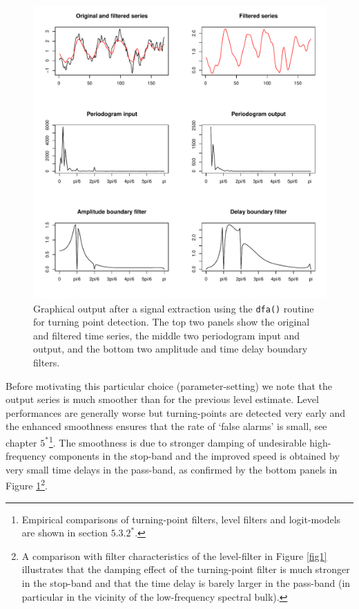 \documentclass[a4paper]{article}
\begin{document}
\begin{figure}[h!] 
\begin{center}
\includegraphics{tpfilter_la5_exp1k5_pbd1k02_pb_6k5_sb6_limamp5_nloops10_d0}
\caption{Graphical output after a signal extraction using the
  \texttt{dfa()} routine for turning point detection. The top two
  panels show the original and filtered time series, the middle two
  periodogram input and output, and the bottom two amplitude and time
  delay boundary filters.\label{fig2}}
\end{center}
\end{figure}

Before motivating this particular choice (parameter-setting) we note
that the output series is much smoother than for the previous level
estimate. Level performances are generally worse but turning-points
are detected very early and the enhanced smoothness ensures that the
rate of `false alarms' is small, see chapter $5^*$\footnote{Empirical
  comparisons of turning-point filters, level filters and logit-models
  are shown in section $5.3.2^*$.}. The smoothness is due to stronger
damping of undesirable high-frequency components in the stop-band and
the improved speed is obtained by very small time delays in the
pass-band, as confirmed by the bottom panels in
Figure \ref{fig2}\footnote{A comparison with filter characteristics of
  the level-filter in Figure \ref{fig1} illustrates that the damping
  effect of the turning-point filter is much stronger in the stop-band
  and that the time delay is barely larger in the pass-band (in
  particular in the vicinity of the low-frequency spectral bulk).}.\\
\end{document}
